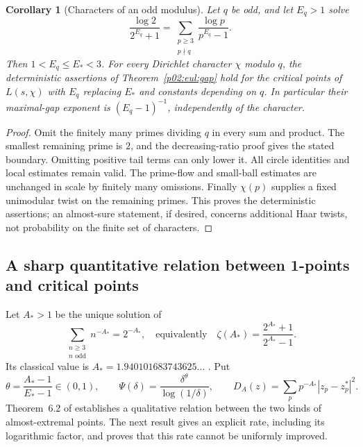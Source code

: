 \documentclass[11pt,letterpaper]{article}
\newtheorem{corollary}[theorem]{Corollary}
\theoremstyle{definition}
\theoremstyle{remark}
\newcommand{\1}{\mathbf 1}
\begin{document}
\begin{corollary}[Characters of an odd modulus]\label{p02:eul:characters}
Let $q$ be odd, and let $E_q>1$ solve
\[
 \frac{\log2}{2^{E_q}+1}
 =\sum_{\substack{p\ge3\\p\nmid q}}
                       \frac{\log p}{p^{E_q}-1}.
\]
Then $1<E_q\le E_*<3$. For every Dirichlet character $\chi$ modulo
$q$, the deterministic assertions of Theorem~\ref{p02:eul:gap} hold for the critical points of
$L(s,\chi)$ with $E_q$ replacing $E_*$ and constants depending on
$q$. In particular their maximal-gap exponent is $(E_q-1)^{-1}$,
independently of the character.
\end{corollary}
\begin{proof}
Omit the finitely many primes dividing $q$ in every sum and product.
The smallest remaining prime is $2$, and the decreasing-ratio proof
gives the stated boundary. Omitting positive tail terms can only lower
it. All circle identities and local estimates remain valid.
The prime-flow and small-ball estimates are unchanged in scale by
finitely many omissions. Finally $\chi(p)$ supplies a fixed unimodular
twist on the remaining primes. This proves the deterministic assertions;
an almost-sure statement, if desired, concerns additional Haar twists,
not probability on the finite set of characters.
\end{proof}

\subsection{A sharp quantitative relation between 1-points and critical points}

Let $A_*>1$ be the unique solution of
\begin{equation}\label{p02:eul:one-edge}
 \sum_{\substack{n\ge3\\n\text{ odd}}}n^{-A_*}=2^{-A_*},
 \quad\text{equivalently}\quad
 \zeta(A_*)=\frac{2^{A_*}+1}{2^{A_*}-1}.
\end{equation}
Its classical value is $A_*=1.940101683743625\ldots$
\cite[Theorem~4.1]{AriasLune}. Put
\begin{equation}\label{p02:eul:locking-scale}
 \theta=\frac{A_*-1}{E_*-1}\in(0,1),\qquad
 \Psi(\delta)=\frac{\delta^\theta}{\log(1/\delta)},
 \qquad
 D_A(z)=\sum_pp^{-A_*}|z_p-z_p^*|^2.
\end{equation}
Theorem~6.2 of \cite{AriasLune} establishes a qualitative relation
between the two kinds of almost-extremal points. The next result gives
an explicit rate, including its logarithmic factor, and proves that
this rate cannot be uniformly improved.
\end{document}

